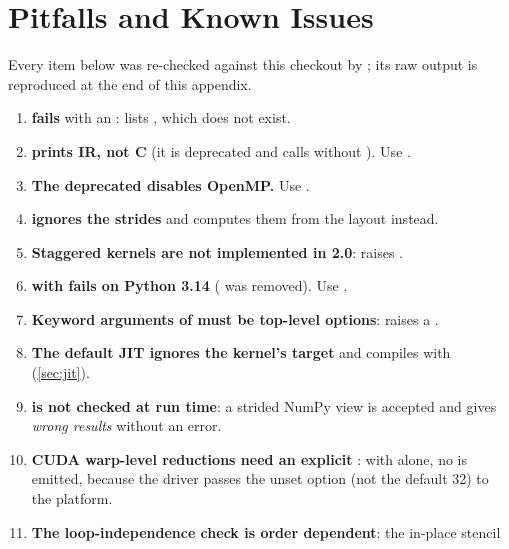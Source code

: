 \chapter{Pitfalls and Known Issues}\label{app:pitfalls}

Every item below was re-checked against this checkout by ;
its raw output is reproduced at the end of this appendix.

\begin{enumerate}
  \item \textbf{ fails} with an :
         lists , which does not exist.
  \item \textbf{ prints IR, not C} (it is deprecated and calls
         without ). Use .
  \item \textbf{The deprecated  disables OpenMP.}
        Use .
  \item \textbf{ ignores the
        strides} and computes them from the layout instead.
  \item \textbf{Staggered kernels are not implemented in 2.0}:
         raises .
  \item \textbf{ with  fails on Python 3.14}
        ( was removed). Use .
  \item \textbf{Keyword arguments of  must be top-level options}:
         raises a .
  \item \textbf{The default JIT ignores the kernel's target} and compiles with
         (\cref{sec:jit}).
  \item \textbf{ is not checked at run time}: a strided
        NumPy view is accepted and gives \emph{wrong results} without an error.
  \item \textbf{CUDA warp-level reductions need an explicit }: with
         alone, no  is
        emitted, because the driver passes the unset option (not the default 32) to the
        platform.
  \item \textbf{The loop-independence check is order dependent}: the in-place stencil

\end{enumerate}
